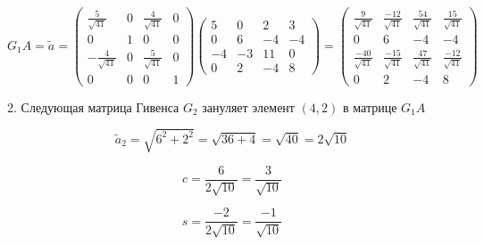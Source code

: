 \documentclass[a4paper,14pt]{article}
\begin{document}
$$
G_1A = \tilde{a} = \begin{pmatrix}
    \frac{5}{\sqrt{41}}  & 0 & \frac{4}{\sqrt{41}} & 0 \\
    0                    & 1 & 0                   & 0 \\
    -\frac{4}{\sqrt{41}} & 0 & \frac{5}{\sqrt{41}} & 0 \\
    0                    & 0 & 0                   & 1
                    \end{pmatrix}
                    \begin{pmatrix}
    5  & 0  & 2  & 3  \\
    0  & 6  & -4 & -4 \\
    -4 & -3 & 11 & 0  \\
    0  & 2  & -4 & 8
                    \end{pmatrix}
                    =
                    \begin{pmatrix}
    \frac{9}{\sqrt{41}}    & \frac{-12}{\sqrt{41}} & \frac{54}{\sqrt{41}} & \frac{15}{\sqrt{41}}  \\   
    0                      & 6                     & -4                   & -4                    \\
    \frac{-40}{\sqrt{41}}  & \frac{-15}{\sqrt{41}} & \frac{47}{\sqrt{41}} & \frac{-12}{\sqrt{41}} \\
    0                      & 2                     & -4                   & 8 
                    \end{pmatrix}
$$


2. Следующая матрица Гивенса $G_2$ зануляет элемент $(4,2)$ в матрице $G_1A$

$$
\tilde{a}_2 = \sqrt{6^2 + 2^2} = \sqrt{36 + 4} = \sqrt{40} = 2\sqrt{10}
$$

$$
c = \frac{6}{2\sqrt{10}} = \frac{3}{\sqrt{10}}
$$

$$
s = \frac{-2}{2\sqrt{10}} = \frac{-1}{\sqrt{10}}
$$
\end{document}
